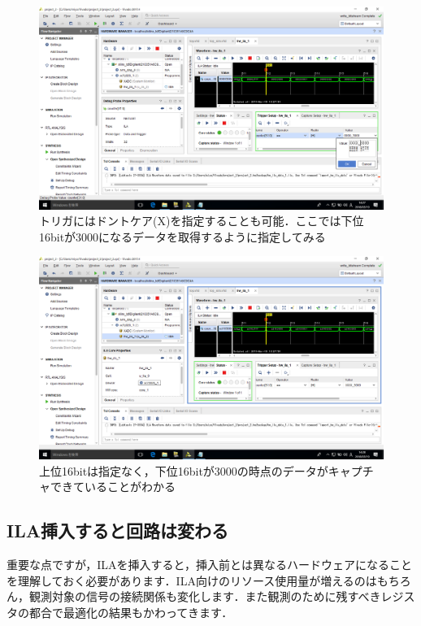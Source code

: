 \documentclass[a4paper,dvipdfmx]{jsarticle}
\begin{document}
 \begin{figure}[H]
  \begin{center}
   \includegraphics[width=.8\textwidth]{chapter05_figures/VirtualBox_Windows10_19_03_2018_14_28_03.png}
  \end{center}
  \caption{トリガにはドントケア(X)を指定することも可能．ここでは下位16bitが3000になるデータを取得するように指定してみる}
 \end{figure}

 \begin{figure}[H]
  \begin{center}
   \includegraphics[width=.8\textwidth]{chapter05_figures/VirtualBox_Windows10_19_03_2018_14_28_15.png}
  \end{center}
  \caption{上位16bitは指定なく，下位16bitが3000の時点のデータがキャプチャできていることがわかる}
 \end{figure}

\subsection{ILA挿入すると回路は変わる}
重要な点ですが，ILAを挿入すると，挿入前とは異なるハードウェアになることを理解しておく必要があります．ILA向けのリソース使用量が増えるのはもちろん，観測対象の信号の接続関係も変化します．また観測のために残すべきレジスタの都合で最適化の結果もかわってきます．
\end{document}
